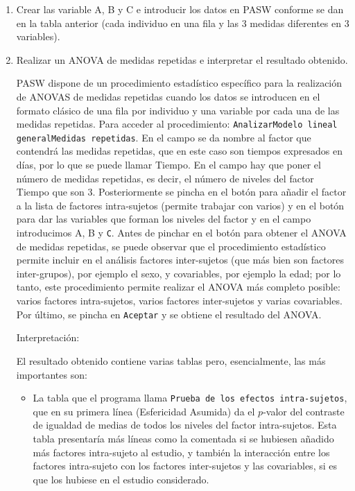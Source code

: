 \begin{enumerate}
\begin{center}
\end{center}


\begin{enumerate}

\item Crear las variable A, B y C e introducir los datos en PASW conforme se dan en la tabla anterior (cada individuo en una fila y las 3 medidas diferentes en 3 variables).

\item Realizar un ANOVA de medidas repetidas e interpretar el resultado obtenido.

\begin{indicacion}{PASW dispone de un procedimiento estadístico específico para la realización de ANOVAS de medidas repetidas cuando los datos se introducen en el formato clásico de una fila por individuo y una variable por cada una de las medidas repetidas. Para acceder al procedimiento: \texttt{Analizar\flecha Modelo lineal general\flecha Medidas repetidas}. En el campo  se da nombre al factor que contendrá las medidas repetidas, que en este caso son tiempos expresados en días, por lo que se puede llamar \textsf{Tiempo}. En el campo  hay que poner el número de medidas repetidas, es decir, el número de niveles del factor \textsf{Tiempo} que son 3. Posteriormente se pincha en el botón  para añadir el factor a la lista de factores intra-sujetos (permite trabajar con varios) y en el botón  para dar las variables que forman los niveles del factor y en el campo  introducimos \textsf{A}, \textsf{B} y \texttt{C}. Antes de pinchar en el botón  para obtener el ANOVA de medidas repetidas, se puede observar que el procedimiento estadístico permite incluir en el análisis factores inter-sujetos (que más bien son factores inter-grupos), por ejemplo el sexo, y covariables, por ejemplo la edad; por lo tanto, este procedimiento permite realizar el ANOVA más completo posible: varios factores intra-sujetos, varios factores inter-sujetos y varias covariables. Por último, se pincha en \texttt{Aceptar} y se obtiene el resultado del ANOVA.

Interpretación:

El resultado obtenido contiene varias tablas pero, esencialmente, las más importantes son:

\begin{itemize}

\item La tabla que el programa llama \texttt{Prueba de los efectos intra-sujetos}, que en su primera línea (Esfericidad Asumida) da el $p$-valor del contraste de igualdad de medias de todos los niveles del factor intra-sujetos. Esta tabla presentaría más líneas como la comentada si se hubiesen añadido más factores intra-sujeto al estudio, y también la interacción entre los factores intra-sujeto con los factores inter-sujetos y las covariables, si es que los hubiese en el estudio considerado.


\end{itemize}}
\end{indicacion}
\end{enumerate}
\end{enumerate}
